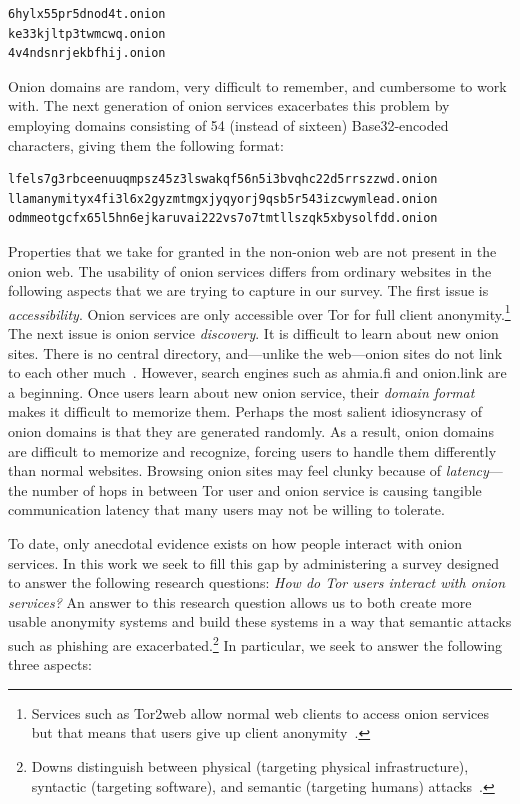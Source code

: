 {\footnotesize
\begin{verbatim}
6hylx55pr5dnod4t.onion
ke33kjltp3twmcwq.onion
4v4ndsnrjekbfhij.onion
\end{verbatim}
}

Onion domains are random, very difficult to remember, and cumbersome to work
with.  The next generation of onion services exacerbates this problem by
employing domains consisting of 54 (instead of sixteen) Base32-encoded
characters, giving them the following format:

{\footnotesize
\begin{verbatim}
lfels7g3rbceenuuqmpsz45z3lswakqf56n5i3bvqhc22d5rrszzwd.onion
llamanymityx4fi3l6x2gyzmtmgxjyqyorj9qsb5r543izcwymlead.onion
odmmeotgcfx65l5hn6ejkaruvai222vs7o7tmtllszqk5xbysolfdd.onion
\end{verbatim}
}

Properties that we take for granted in the non-onion web are not present in the
onion web.  The usability of onion services differs from ordinary websites in
the following aspects that we are trying to capture in our survey.  The first
issue is \emph{accessibility}.  Onion services are only accessible over Tor for
full client anonymity.\footnote{Services such as Tor2web allow normal web
clients to access onion services but that means that users give up client
anonymity~\cite{tor2web}.} The next issue is onion service \emph{discovery}.
It is difficult to learn about new onion sites.  There is no central directory,
and---unlike the web---onion sites do not link to each other
much~\cite{Griffith2017a}.  However, search engines such as ahmia.fi and
onion.link are a beginning.  Once users learn about new onion service, their
\emph{domain format} makes it difficult to memorize them.  Perhaps the most
salient idiosyncrasy of onion domains is that they are generated randomly.  As
a result, onion domains are difficult to memorize and recognize, forcing users
to handle them differently than normal websites.  Browsing onion sites may feel
clunky because of \emph{latency}---the number of hops in between Tor user and
onion service is causing tangible communication latency that many users may not
be willing to tolerate.

To date, only anecdotal evidence exists on how people interact with onion
services.  In this work we seek to fill this gap by administering a survey
designed to answer the following research questions: \emph{How do Tor users
interact with onion services?}  An answer to this research question allows us
to both create more usable anonymity systems and build these systems in a way
that semantic attacks such as phishing are exacerbated.\footnote{Downs \ea
distinguish between physical (\ie targeting physical infrastructure),
syntactic (\ie targeting software), and semantic (\ie targeting humans)
attacks~\cite[\S~1]{Downs2006a}.}  In particular, we seek to answer the
following three aspects:

